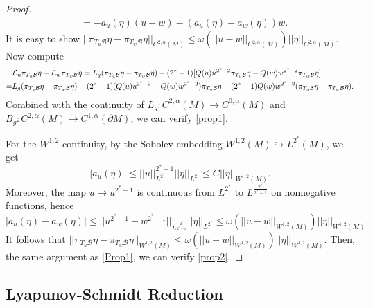 \documentclass[12pt]{amsart}
\newcommand{\B}{\mathcal{B}}
\begin{document}
\begin{proof}
\begin{align*}
       &=-a_u(\eta) (u-w) -(a_u(\eta) -a_w(\eta))w.
   \end{align*}
   It is easy to show $||\pi_{T_u{\B}} \eta -\pi_{T_w{\B}} \eta||_{C^{2,\alpha}(M)} \leq \omega(||u-w||_{C^{2,\alpha}(M)})||\eta||_{C^{2,\alpha}(M)}.$
   Now compute 
   \begin{align} \label{Prop1}
       &\mathcal{L}_u \pi_{T_u{\B}} \eta -\mathcal{L}_w \pi_{T_w{\B}} \eta 
       =L_g (\pi_{T_u{\B}} \eta -\pi_{T_w{\B}} \eta) -(2^*-1)[Q(u)u^{2^*-2}\pi_{T_u{\B}} \eta -Q(w)w^{2^*-2}\pi_{T_w{\B}} \eta] \notag\\
       =&L_g (\pi_{T_u{\B}} \eta -\pi_{T_w{\B}} \eta) -(2^*-1)(Q(u)u^{2^*-2}-Q(w)w^{2^*-2})\pi_{T_u{\B}} \eta - (2^*-1)Q(w)w^{2^*-2}(\pi_{T_u{\B}} \eta -\pi_{T_w{\B}} \eta).
   \end{align}
   Combined with the continuity of $L_g: C^{2,\alpha}(M) \to C^{0,\alpha}(M)$ and $B_g : C^{2,\alpha}(M) \to C^{1,\alpha}(\partial M) $, we can verify \eqref{prop1}.

   For the $W^{1,2} $ continuity, by the Sobolev embedding $W^{1,2} (M) \hookrightarrow L^{2^*}(M)$,
   we get 
   \begin{equation*}
       |a_u(\eta)| \leq ||u||_{L^{2^*}}^{2^*-1} ||\eta ||_{L^{2^*}} \leq C ||\eta ||_{W^{1,2}(M)}.
   \end{equation*}
   Moreover, the map $u \mapsto u^{2^*-1}$ is continuous from $L^{2^*}$ to $L^{\frac{2^*}{2^*-1}
   }$ on nonnegative functions, hence
   \begin{equation*}
       |a_u(\eta)-a_w(\eta)|\leq ||u^{2^*-1}-w^{2^*-1}||_{L^{\frac{2^*}{2^*-1}}}||\eta||_{L^{2^*}}
       \leq \omega(||u-w||_{W^{1,2}(M)}) ||\eta ||_{W^{1,2}(M)}.
   \end{equation*}
   It follows that $||\pi_{T_u{\B}} \eta -\pi_{T_w{\B}} \eta||_{W^{1,2}(M)} \leq \omega(||u-w||_{W^{1,2}(M)})||\eta||_{W^{1,2}(M)}.$
   Then, the same argument as \eqref{Prop1}, we can verify \eqref{prop2}.
   
\end{proof}

\subsection{Lyapunov-Schmidt Reduction} 
\end{document}
